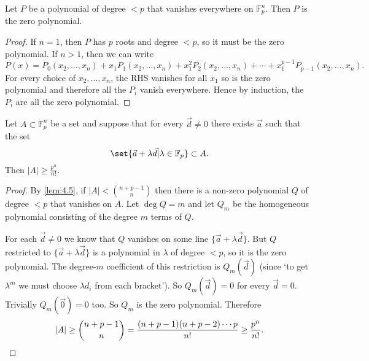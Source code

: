 \documentclass{article}
\newcommand{\1}[1]{\mathbbm{1}_{#1}}
\begin{document}
\begin{nlemma}
  Let $P$ be a polynomial of degree $<p$ that vanishes everywhere on $\mathbb{F}_p^n$. Then $P$ is the zero polynomial.
\end{nlemma}
\begin{proof}
  If $n=1$, then $P$ has $p$ roots and degree $<p$, so it must be the zero polynomial.
  If $n > 1$, then we can write
  \begin{equation*}
    P(x) = P_0(x_2, \dotsc, x_n) + x_1 P_1(x_2, \dotsc, x_n) + x_1^2 P_2(x_2, \dotsc, x_n)+ \dotsb + x_1^{p-1} P_{p-1}(x_2, \dotsc, x_n).
  \end{equation*}
  For every choice of $x_2, \dotsc, x_n$, the RHS vanishes for all $x_1$ so is the zero polynomial and therefore all the $P_i$ vanish everywhere. Hence by induction, the $P_i$ are all the zero polynomial.
\end{proof}
\begin{thm}
  Let $A \subset \mathbb{F}_p^n$ be a set and suppose that for every $\vec{d} \neq 0$ there exists $\vec{a}$ such that the set
  \begin{equation*}
    \set{\vec{a} + \lambda \vec{d} | \lambda \in \mathbb{F}_p} \subset A.
  \end{equation*}
  Then $|A| \geq \frac{p^n}{n!}$.
\end{thm}
\begin{proof}
  By \cref{lem:4.5}, if $|A| < \binom{n+p-1}{n}$ then there is a non-zero polynomial $Q$ of degree $<p$ that vanishes on $A$.
  Let $\deg Q = m$ and let $Q_m$ be the homogeneous polynomial consisting of the degree $m$ terms of $Q$.

  For each $\vec{d} \neq 0$ we know that $Q$ vanishes on some line $\{\vec{a} + \lambda \vec{d}\}$.
  But $Q$ restricted to $\{\vec{a} + \lambda \vec{d}\}$ is a polynomial in $\lambda$ of degree $<p$, so it is the zero polynomial.
  The degree-$m$ coefficient of this restriction is $Q_m(\vec{d})$ (since `to get $\lambda^m$ we must choose $\lambda d_i$ from each bracket').
  So $Q_m(\vec{d}) = 0$ for every $\vec{d} = 0$. Trivially $Q_m(\vec{0}) = 0$ too. So $Q_m$ is the zero polynomial.
  Therefore
  \begin{equation*}
    |A| \geq \binom{n+p-1}{n} = \frac{(n+p-1)(n+p-2) \dotsm p}{n!} \geq \frac{p^n}{n!}. \qedhere
  \end{equation*}
\end{proof}
\end{document}
